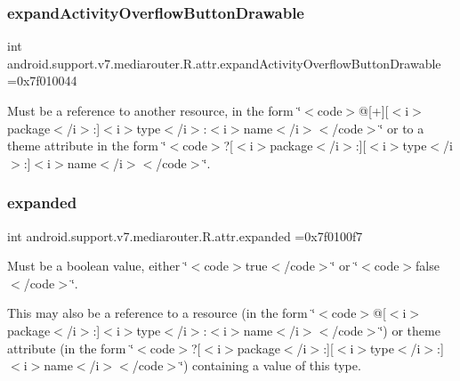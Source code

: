 \subsubsection{\texorpdfstring{expand\+Activity\+Overflow\+Button\+Drawable}{expandActivityOverflowButtonDrawable}}
{\footnotesize\ttfamily int android.\+support.\+v7.\+mediarouter.\+R.\+attr.\+expand\+Activity\+Overflow\+Button\+Drawable =0x7f010044\hspace{0.3cm}{\ttfamily [static]}}

Must be a reference to another resource, in the form \char`\"{}$<$code$>$@\mbox{[}+\mbox{]}\mbox{[}$<$i$>$package$<$/i$>$\+:\mbox{]}$<$i$>$type$<$/i$>$\+:$<$i$>$name$<$/i$>$$<$/code$>$\char`\"{} or to a theme attribute in the form \char`\"{}$<$code$>$?\mbox{[}$<$i$>$package$<$/i$>$\+:\mbox{]}\mbox{[}$<$i$>$type$<$/i$>$\+:\mbox{]}$<$i$>$name$<$/i$>$$<$/code$>$\char`\"{}. \mbox{\label{classandroid_1_1support_1_1v7_1_1mediarouter_1_1R_1_1attr_a03cd232d62bb29f337ad465e753df1e6}} 
\subsubsection{\texorpdfstring{expanded}{expanded}}
{\footnotesize\ttfamily int android.\+support.\+v7.\+mediarouter.\+R.\+attr.\+expanded =0x7f0100f7\hspace{0.3cm}{\ttfamily [static]}}

Must be a boolean value, either \char`\"{}$<$code$>$true$<$/code$>$\char`\"{} or \char`\"{}$<$code$>$false$<$/code$>$\char`\"{}. 

This may also be a reference to a resource (in the form \char`\"{}$<$code$>$@\mbox{[}$<$i$>$package$<$/i$>$\+:\mbox{]}$<$i$>$type$<$/i$>$\+:$<$i$>$name$<$/i$>$$<$/code$>$\char`\"{}) or theme attribute (in the form \char`\"{}$<$code$>$?\mbox{[}$<$i$>$package$<$/i$>$\+:\mbox{]}\mbox{[}$<$i$>$type$<$/i$>$\+:\mbox{]}$<$i$>$name$<$/i$>$$<$/code$>$\char`\"{}) containing a value of this type. \mbox{\label{classandroid_1_1support_1_1v7_1_1mediarouter_1_1R_1_1attr_a5381034a891461ad50ed45590ebf8679}} 
